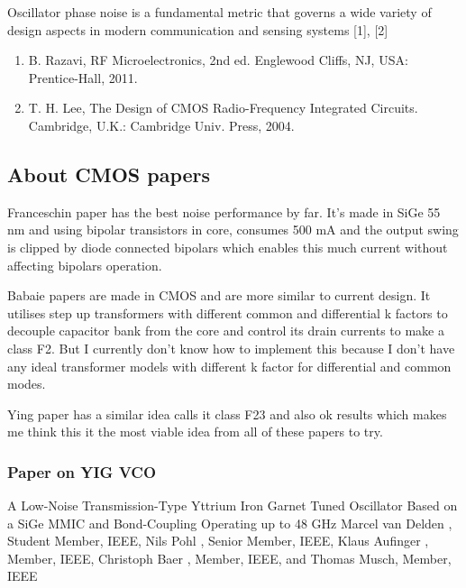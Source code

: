 \documentclass{article}
\begin{document}
Oscillator phase noise is a fundamental metric that governs a wide variety of design aspects in modern communication and sensing systems [1], [2]

\begin{enumerate} %
	\item B. Razavi, RF Microelectronics, 2nd ed. Englewood Cliffs, NJ, USA: Prentice-Hall, 2011. 
	\item T. H. Lee, The Design of CMOS Radio-Frequency Integrated Circuits. Cambridge, U.K.: Cambridge Univ. Press, 2004.
\end{enumerate}


\subsection{About CMOS papers}


Franceschin paper has the best noise performance by far. It's made in SiGe 55 nm and using bipolar transistors in core, consumes 500 mA and the output swing is clipped by diode connected bipolars which enables this much current without affecting bipolars operation.

Babaie papers are made in CMOS and are more similar to current design. It utilises step up transformers with different common and differential k factors to decouple capacitor bank from the core and control its drain currents to make a class F2. But I currently don't know how to implement this because I don't have any ideal transformer models with different k factor for differential and common modes.

Ying paper has a similar idea calls it class F23 and also ok results which makes me think this it the most viable idea from all of these papers to try.


\subsubsection{Paper on YIG VCO}

A Low-Noise Transmission-Type Yttrium Iron Garnet Tuned Oscillator Based on a SiGe MMIC and Bond-Coupling Operating up to 48 GHz Marcel van Delden , Student Member, IEEE, Nils Pohl , Senior Member, IEEE, Klaus Aufinger , Member, IEEE, Christoph Baer , Member, IEEE, and Thomas Musch, Member, IEEE
\end{document}

